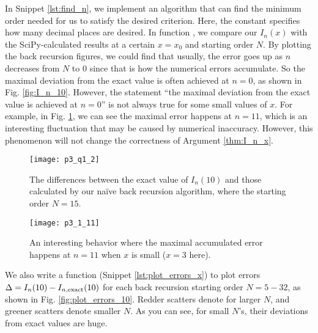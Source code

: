 In Snippet \ref{lst:find_n}, we implement an algorithm that can find the minimum order
needed for us to satisfy the desired criterion.
Here, the constant  specifies how many decimal places are desired.
In function , we compare
our $I_n(x)$ with the SciPy-calculated results at a certain $x = x_0$ and starting order $N$.
By plotting the back recursion figures, we could find that usually, the error goes up
as $n$ decreases from $N$ to $0$ since that is how the numerical errors accumulate.
So the maximal deviation from the exact value is often achieved at $n = 0$, as shown in
Fig. \ref{fig:I_n_10}. However, the statement ``the maximal deviation from the exact value
is achieved at $n = 0$'' is not always true for some small values of $x$. For example,
in Fig. \ref{fig:I_n_3}, we can see the maximal error happens at $n = 11$, which is an
interesting fluctuation that may be caused by numerical inaccuracy. However, this phenomenon
will not change the correctness of Argument \ref{thm:I_n_x}.

\begin{figure} %
    \centering
    \begin{minipage}[t]{0.45\linewidth}
        \centering
        \texttt{[image: p3\_q1\_2]}
        \caption{The differences between the exact value of $I_n(10)$ and those calculated by
            our naïve back recursion algorithm, where the starting order $N = 15$.}
        \label{fig:I_n_10}
    \end{minipage}
    \hfil
    \begin{minipage}[t]{0.45\linewidth}
        \centering
        \texttt{[image: p3\_1\_11]}
        \caption{An interesting behavior where the maximal accumulated error happens at
            $n = 11$ when $x$ is small ($x = 3$ here).}
        \label{fig:I_n_3}
    \end{minipage}
\end{figure}

We also write a function  (Snippet \ref{lst:plot_errors_x}) to
plot errors $\Delta = I_n(10) - I_{n,\textnormal{exact}}(10)$ for each
back recursion starting order $N = 5 - 32$, as shown in Fig. \ref{fig:plot_errors_10}.
Redder scatters denote for larger $N$, and greener scatters denote
smaller $N$. As you can see, for small $N$'s, their deviations from exact values are huge.

